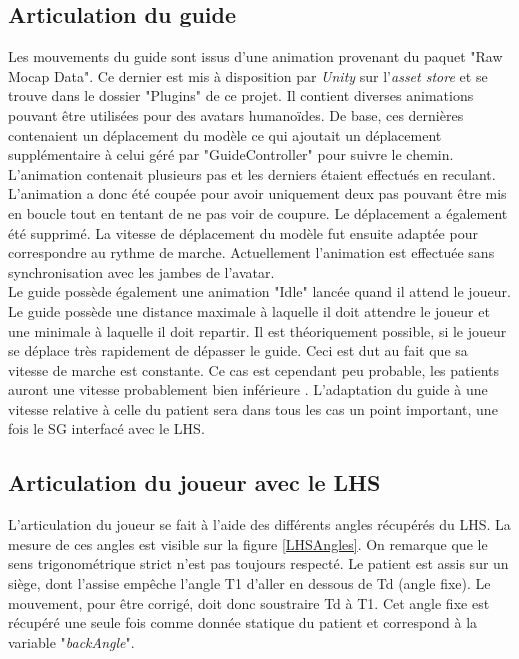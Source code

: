	\subsection*{Articulation du guide}
		Les mouvements du guide sont issus d'une animation provenant du paquet "Raw Mocap Data". Ce dernier est mis à disposition par \textit{Unity} sur l'\textit{asset store} \cite{RawMocapData_assetStorePage} et se trouve dans le dossier "Plugins" de ce projet. Il contient diverses animations pouvant être utilisées pour des avatars humanoïdes. De base, ces dernières contenaient un déplacement du modèle ce qui ajoutait un déplacement supplémentaire à celui géré par "GuideController" pour suivre le chemin. L'animation contenait plusieurs pas et les derniers étaient effectués en reculant. L'animation a donc été coupée pour avoir uniquement deux pas pouvant être mis en boucle tout en tentant de ne pas voir de coupure. Le déplacement a également été supprimé. La vitesse de déplacement du modèle fut ensuite adaptée pour correspondre au rythme de marche. Actuellement l'animation est effectuée sans synchronisation avec les jambes de l'avatar.
		\\
		
		Le guide possède également une animation "Idle" lancée quand il attend le joueur. Le guide possède une distance maximale à laquelle il doit attendre le joueur et une minimale à laquelle il doit repartir. Il est théoriquement possible, si le joueur se déplace très rapidement de dépasser le guide. Ceci est dut au fait que sa vitesse de marche est constante. Ce cas est cependant peu probable, les patients auront une vitesse probablement bien inférieure \cite{Eng_GaitTrainingStrategies_WalkingSpeed}. L'adaptation du guide à une vitesse relative à celle du patient sera dans tous les cas un point important, une fois le SG interfacé avec le LHS.
		
	\subsection*{Articulation du joueur avec le LHS}
	
		L'articulation du joueur se fait à l'aide des différents angles récupérés du LHS. La mesure de ces angles est visible sur la figure \ref{LHSAngles}. On remarque que le sens trigonométrique strict n'est pas toujours respecté. Le patient est assis sur un siège, dont l'assise empêche l'angle T1 d'aller en dessous de Td (angle fixe). Le mouvement, pour être corrigé, doit donc soustraire Td à T1. Cet angle fixe est récupéré une seule fois comme donnée statique du patient et correspond à la variable "\textit{backAngle}".\medskip
		
